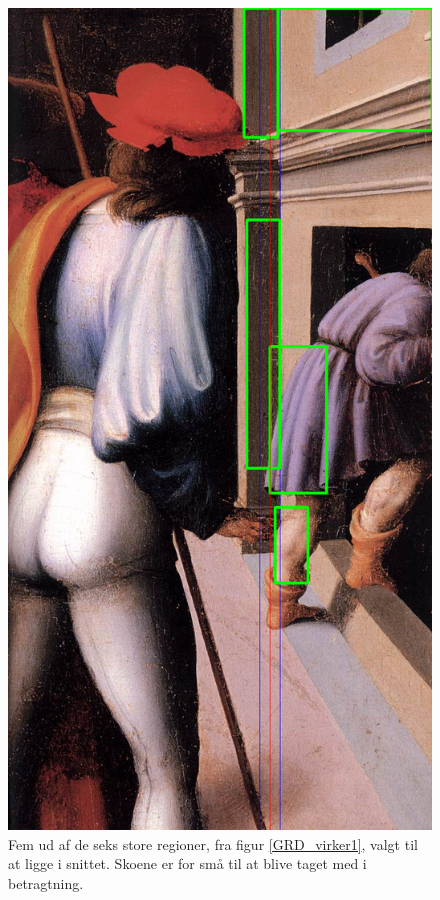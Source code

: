 \begin{figure}[h!!]
	\begin{center}
		\includegraphics[scale=0.3,angle=0]{afsnit/afprovning/billeder/naive_losning/naiv_kfarver_sdetaljer.png}
	\end{center}
	\caption[]{Fem ud af de seks store regioner, fra figur
	\ref{GRD_virker1}, valgt til at ligge i snittet. Skoene er for små til
	at blive taget med i betragtning.}
	\label{naiv_kfarver_sdetaljer}
\end{figure}

